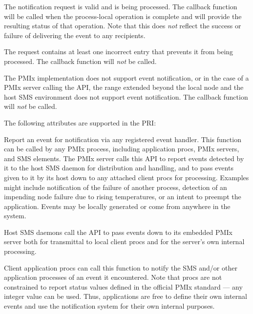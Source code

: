 \begin{constantdesc}
\item {} The notification request is valid and is being processed. The callback function will be called when the process-local operation is complete and will provide the resulting status of that operation. Note that this does \textit{not} reflect the success or failure of delivering the event to any recipients.
\item {} The request contains at least one incorrect entry that prevents it from being processed. The callback function will \textit{not} be called.
\item {} The \ac{PMIx} implementation does not support event notification, or in the case of a \ac{PMIx} server calling the API, the range extended beyond the local node and the host \ac{SMS} environment does not support event notification. The callback function will \textit{not} be called.
\end{constantdesc}

\priattr
The following attributes are supported in the \ac{PRI}:


\descr

Report an event for notification via any
registered event handler. This function can be called by any \ac{PMIx} process, including application procs, \ac{PMIx} servers, and \ac{SMS} elements. The \ac{PMIx} server calls this \ac{API} to report events detected
by it to the host \ac{SMS} daemon for distribution and handling, and to pass events given to it by its host down to any attached client procs for processing. Examples might include notification of the failure of another process, detection of an impending node failure due to rising temperatures, or an intent to preempt the application. Events may be locally generated or come from anywhere in the system.

Host \ac{SMS} daemons call the API to pass events down to its embedded \ac{PMIx} server both for transmittal to local client procs and for the server's own internal processing.

Client application procs can call this function to notify the \ac{SMS} and/or other application processes of an event it encountered. Note that procs are not constrained to report status values defined in the official \ac{PMIx} standard --- any integer value can be used. Thus, applications are free to define their own internal events and use the notification system for their own internal purposes.

